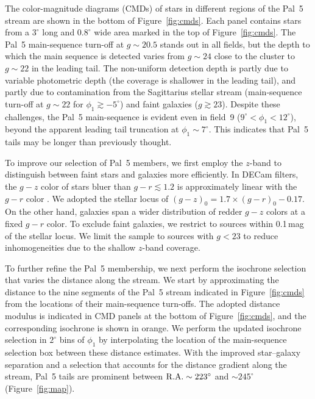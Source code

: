 \documentclass[twocolumn]{aastex62}
\begin{document}
The color-magnitude diagrams (CMDs) of stars in different regions of the Pal~5 stream are shown in the bottom of Figure~\ref{fig:cmds}.
Each panel contains stars from a $3^\circ$ long and $0.8^\circ$ wide area marked in the top of Figure~\ref{fig:cmds}.
The Pal~5 main-sequence turn-off at $g\sim20.5$ stands out in all fields, but the depth to which the main sequence is detected varies from $g\sim24$ close to the cluster to $g\sim22$ in the leading tail.
The non-uniform detection depth is partly due to variable photometric depth (the coverage is shallower in the leading tail), and partly due to contamination from the Sagittarius stellar stream (main-sequence turn-off at $g\sim22$ for $\phi_1\gtrsim-5^\circ$) and faint galaxies ($g\gtrsim23$).
Despite these challenges, the Pal~5 main-sequence is evident even in field~9 ($9^\circ<\phi_1<12^\circ$), beyond the apparent leading tail truncation at $\phi_1\sim7^\circ$.
This indicates that Pal~5 tails may be longer than previously thought.

To improve our selection of Pal~5 members, we first employ the $z$-band to distinguish between faint stars and galaxies more efficiently.
In DECam filters, the $g-z$ color of stars bluer than $g-r\lesssim1.2$ is approximately linear with the $g-r$ color \citep[e.g.,][]{dey2019}.
We adopted the stellar locus of $(g-z)_0 = 1.7\times(g-r)_0 -0.17$.
On the other hand, galaxies span a wider distribution of redder $g-z$ colors at a fixed $g-r$ color.
To exclude faint galaxies, we restrict to sources within 0.1\,mag of the stellar locus.
We limit the sample to sources with $g<23$ to reduce inhomogeneities due to the shallow $z$-band coverage.

To further refine the Pal~5 membership, we next perform the isochrone selection that varies the distance along the stream.
We start by approximating the distance to the nine segments of the Pal~5 stream indicated in Figure~\ref{fig:cmds} from the locations of their main-sequence turn-offs.
The adopted distance modulus is indicated in CMD panels at the bottom of Figure~\ref{fig:cmds}, and the corresponding isochrone is shown in orange.
We perform the updated isochrone selection in $2^\circ$ bins of $\phi_1$ by interpolating the location of the main-sequence selection box between these distance estimates.
With the improved star--galaxy separation and a selection that accounts for the distance gradient along the stream, Pal~5 tails are prominent between $\rm R.A.\sim223^\circ$ and $\sim245^\circ$ (Figure~\ref{fig:map}).
\end{document}
